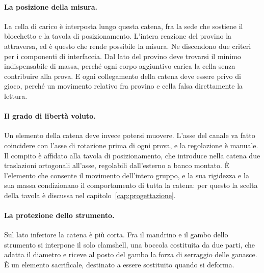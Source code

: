 \paragraph{La posizione della misura.}
La cella di carico è interposta lungo questa catena, fra la sede che sostiene il
blocchetto e la tavola di posizionamento. L'intera reazione del provino la
attraversa, ed è questo che rende possibile la misura. Ne discendono due criteri
per i componenti di interfaccia. Dal lato del provino deve trovarsi il minimo
indispensabile di massa, perché ogni corpo aggiuntivo carica la cella senza
contribuire alla prova. E ogni collegamento della catena deve essere privo di
gioco, perché un movimento relativo fra provino e cella falsa direttamente la
lettura.

\paragraph{Il grado di libertà voluto.}
Un elemento della catena deve invece potersi muovere. L'asse del canale va fatto
coincidere con l'asse di rotazione prima di ogni prova, e la regolazione è
manuale. Il compito è affidato alla tavola di posizionamento, che introduce nella
catena due traslazioni ortogonali all'asse, regolabili dall'esterno a banco
montato. È l'elemento che consente il movimento dell'intero gruppo, e la sua
rigidezza e la sua massa condizionano il comportamento di tutta la catena: per
questo la scelta della tavola è discussa nel capitolo~\ref{cap:progettazione}.

\paragraph{La protezione dello strumento.}
Sul lato inferiore la catena è più corta. Fra il mandrino e il gambo dello
strumento si interpone il solo clamshell, una boccola costituita da due parti,
che adatta il diametro e riceve al posto del gambo la forza di serraggio delle
ganasce. È un elemento sacrificale, destinato a essere sostituito quando si
deforma.

